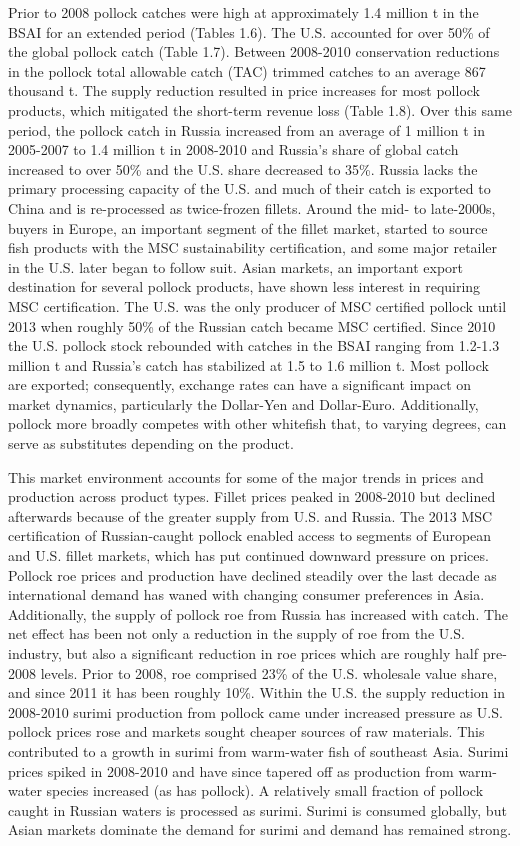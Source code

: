 Prior to 2008 pollock catches were high at approximately 1.4 million t
in the BSAI for an extended period (Tables 1.6). The U.S. accounted for
over 50\% of the global pollock catch (Table 1.7). Between 2008-2010
conservation reductions in the pollock total allowable catch (TAC)
trimmed catches to an average 867 thousand t. The supply reduction
resulted in price increases for most pollock products, which mitigated
the short-term revenue loss (Table 1.8). Over this same period, the
pollock catch in Russia increased from an average of 1 million t in
2005-2007 to 1.4 million t in 2008-2010 and Russia's share of global
catch increased to over 50\% and the U.S. share decreased to 35\%.
Russia lacks the primary processing capacity of the U.S. and much of
their catch is exported to China and is re-processed as twice-frozen
fillets. Around the mid- to late-2000s, buyers in Europe, an important
segment of the fillet market, started to source fish products with the
MSC sustainability certification, and some major retailer in the U.S.
later began to follow suit. Asian markets, an important export
destination for several pollock products, have shown less interest in
requiring MSC certification. The U.S. was the only producer of MSC
certified pollock until 2013 when roughly 50\% of the Russian catch
became MSC certified. Since 2010 the U.S. pollock stock rebounded with
catches in the BSAI ranging from 1.2-1.3 million t and Russia's catch
has stabilized at 1.5 to 1.6 million t. Most pollock are exported;
consequently, exchange rates can have a significant impact on market
dynamics, particularly the Dollar-Yen and Dollar-Euro. Additionally,
pollock more broadly competes with other whitefish that, to varying
degrees, can serve as substitutes depending on the product.

This market environment accounts for some of the major trends in prices
and production across product types. Fillet prices peaked in 2008-2010
but declined afterwards because of the greater supply from U.S. and
Russia. The 2013 MSC certification of Russian-caught pollock enabled
access to segments of European and U.S. fillet markets, which has put
continued downward pressure on prices. Pollock roe prices and production
have declined steadily over the last decade as international demand has
waned with changing consumer preferences in Asia. Additionally, the
supply of pollock roe from Russia has increased with catch. The net
effect has been not only a reduction in the supply of roe from the U.S.
industry, but also a significant reduction in roe prices which are
roughly half pre-2008 levels. Prior to 2008, roe comprised 23\% of the
U.S. wholesale value share, and since 2011 it has been roughly 10\%.
Within the U.S. the supply reduction in 2008-2010 surimi production from
pollock came under increased pressure as U.S. pollock prices rose and
markets sought cheaper sources of raw materials. This contributed to a
growth in surimi from warm-water fish of southeast Asia. Surimi prices
spiked in 2008-2010 and have since tapered off as production from
warm-water species increased (as has pollock). A relatively small
fraction of pollock caught in Russian waters is processed as surimi.
Surimi is consumed globally, but Asian markets dominate the demand for
surimi and demand has remained strong.


